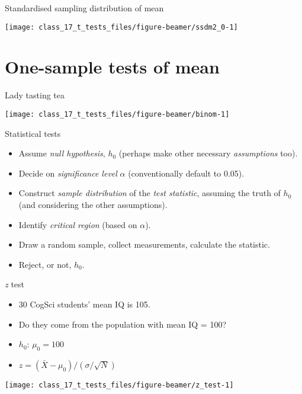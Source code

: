 \documentclass[
  ignorenonframetext,
]{beamer}
\providecommand{\tightlist}{%
  \setlength{\itemsep}{0pt}\setlength{\parskip}{0pt}}
\begin{document}
\begin{frame}{Standardised sampling distribution of mean}
\label{standardised-sampling-distribution-of-mean-3}
\begin{center}\texttt{[image: class\_17\_t\_tests\_files/figure-beamer/ssdm2\_0-1]} \end{center}
\end{frame}

\section{One-sample tests of mean}\label{one-sample-tests-of-mean}

\begin{frame}{Lady tasting tea}
\label{lady-tasting-tea}
\begin{center}\texttt{[image: class\_17\_t\_tests\_files/figure-beamer/binom-1]} \end{center}
\end{frame}

\begin{frame}{Statistical tests}
\label{statistical-tests}
\begin{itemize}
\tightlist
\item
  Assume \emph{null hypothesis}, \(h_0\) (perhaps make other necessary
  \emph{assumptions} too).
\item
  Decide on \emph{significance level} \(\alpha\) (conventionally default
  to 0.05).
\item
  Construct \emph{sample distribution} of the \emph{test statistic},
  assuming the truth of \(h_0\) (and considering the other assumptions).
\item
  Identify \emph{critical region} (based on \(\alpha\)).
\item
  Draw a random sample, collect measurements, calculate the statistic.
\item
  Reject, or not, \(h_0\).
\end{itemize}
\end{frame}

\begin{frame}{\emph{z} test}
\label{z-test}
\begin{itemize}
\tightlist
\item
  30 CogSci students' mean IQ is 105.
\item
  Do they come from the population with mean IQ = 100?
\item
  \(h_0\): \(\mu_0 = 100\)
\item
  \(z = (\bar{X} - \mu_0) / (\sigma / \sqrt{N})\)
\end{itemize}

\begin{center}\texttt{[image: class\_17\_t\_tests\_files/figure-beamer/z\_test-1]} \end{center}
\end{frame}
\end{document}
